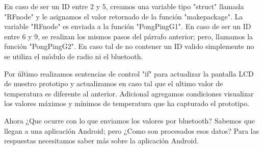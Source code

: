 \par \noindent
En caso de ser un ID entre 2 y 5, creamos una variable tipo "struct" llamada "RFnode" y le asignamos el valor retornado de la función "makepackage". La variable "RFnode" es enviada a la función "PongPingG1". En caso de ser un ID entre 6 y 9, se realizan los mismos pasos del párrafo anterior; pero, llamamos la función "PongPingG2". En caso tal de no contener un ID valido simplemente no se utiliza el módulo de radio ni el bluetooth.

\par \noindent
Por último realizamos sentencias de control "if" para actualizar la pantalla LCD de nuestro prototipo y actualizamos en caso tal que el ultimo valor de temperatura es diferente al anterior. Adicional agregamos condiciones visualizar los valores máximos y mínimos de temperatura que ha capturado el prototipo.

\par \noindent
Ahora ¿Que ocurre con lo que enviamos los valores por bluetooth? Sabemos que llegan a una aplicación Android; pero ¿Como son procesados esos datos? Para las respuestas necesitamos saber más sobre la aplicación Android.

